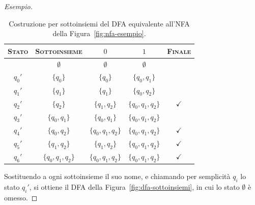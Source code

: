 \documentclass[a4paper, 11pt, oneside]{book}
\theoremstyle{formale}
\newenvironment{esempio}
    {\begin{proof}[\textit{Esempio}]\renewcommand{\qedsymbol}{$\diamond$}}
    {\end{proof}}
\begin{document}
\begin{esempio}
        \begin{table}[H]
            \centering
            \begin{tabular}{ccccc}
                \toprule
                \textsc{Stato} & \textsc{Sottoinsieme} & $0$ & $1$ & \textsc{Finale} \\
                \midrule
                & $\emptyset$ & $\emptyset$ & $\emptyset$ & \\
                $q_0'$ & $\{q_0\}$ & $\{q_0\}$ & $\{q_0, q_1\}$ & \\
                $q_1'$ & $\{q_1\}$ & $\{q_1\}$ & $\{q_0, q_2\}$ & \\
                $q_2'$ & $\{q_2\}$ & $\{q_1, q_2\}$ & $\{q_0, q_1, q_2\}$ & $\checkmark$ \\
                $q_3'$ & $\{q_0, q_1\}$ & $\{q_0, q_1\}$ & $\{q_0, q_1, q_2\}$ & \\
                $q_4'$ & $\{q_0, q_2\}$ & $\{q_0, q_1, q_2\}$ & $\{q_0, q_1, q_2\}$
                    & $\checkmark$ \\
                $q_5'$ & $\{q_1, q_2\}$ & $\{q_1, q_2\}$ & $\{q_0, q_1, q_2\}$
                    & $\checkmark$ \\
                $q_6'$ & $\{q_0, q_1, q_2\}$ & $\{q_0, q_1, q_2\}$ & $\{q_0, q_1, q_2\}$
                    & $\checkmark$ \\
                \bottomrule
            \end{tabular}
            \caption{Costruzione per sottoinsiemi del DFA equivalente all'NFA della
                Figura~\ref{fig:nfa-esempio}.}
            \label{tab:sottoinsiemi}
        \end{table}

        Sostituendo a ogni sottoinsieme il suo nome, e chiamando per semplicit\`a $q_i$
        lo stato $q_i'$, si ottiene il DFA della Figura~\ref{fig:dfa-sottoinsiemi}, in cui
        lo stato $\emptyset$ \`e omesso.


\end{esempio}
\end{document}
